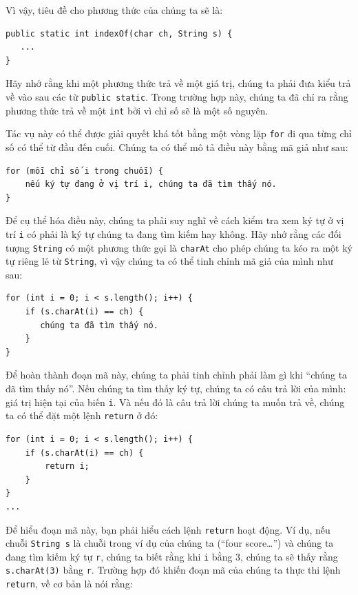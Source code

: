 Vì vậy, tiêu đề cho phương thức của chúng ta sẽ là:

\begin{verbatim}
public static int indexOf(char ch, String s) {
   ...
}
\end{verbatim}

Hãy nhớ rằng khi một phương thức trả về một giá trị, chúng ta phải đưa
kiểu trả về vào sau các từ \texttt{public\ static}. Trong trường hợp
này, chúng ta đã chỉ ra rằng phương thức trả về một \texttt{int} bởi vì
chỉ số sẽ là một số nguyên.

Tác vụ này có thể được giải quyết khá tốt bằng một vòng lặp \texttt{for}
đi qua từng chỉ số có thể từ đầu đến cuối. Chúng ta có thể mô tả điều
này bằng mã giả như sau:

\begin{verbatim}
for (mỗi chỉ số i trong chuỗi) {
    nếu ký tự đang ở vị trí i, chúng ta đã tìm thấy nó.
}
\end{verbatim}

Để cụ thể hóa điều này, chúng ta phải suy nghĩ về cách kiểm tra xem ký
tự ở vị trí \texttt{i} có phải là ký tự chúng ta đang tìm kiếm hay
không. Hãy nhớ rằng các đối tượng \texttt{String} có một phương thức gọi
là \texttt{charAt} cho phép chúng ta kéo ra một ký tự riêng lẻ từ
\texttt{String}, vì vậy chúng ta có thể tinh chỉnh mã giả của mình như
sau:

\begin{verbatim}
for (int i = 0; i < s.length(); i++) {
    if (s.charAt(i) == ch) {
       chúng ta đã tìm thấy nó.
    }
}
\end{verbatim}

Để hoàn thành đoạn mã này, chúng ta phải tinh chỉnh phải làm gì khi
``chúng ta đã tìm thấy nó''. Nếu chúng ta tìm thấy ký tự, chúng ta có
câu trả lời của mình: giá trị hiện tại của biến \texttt{i}. Và nếu đó là
câu trả lời chúng ta muốn trả về, chúng ta có thể đặt một lệnh
\texttt{return} ở đó:

\begin{verbatim}
for (int i = 0; i < s.length(); i++) {
    if (s.charAt(i) == ch) {
        return i;
    }
}
...
\end{verbatim}

Để hiểu đoạn mã này, bạn phải hiểu cách lệnh \texttt{return} hoạt động.
Ví dụ, nếu chuỗi \texttt{String\ s} là chuỗi trong ví dụ của chúng ta
(``four score\ldots{}'') và chúng ta đang tìm kiếm ký tự
\texttt{\textquotesingle{}r\textquotesingle{}}, chúng ta biết rằng khi
\texttt{i} bằng 3, chúng ta sẽ thấy rằng \texttt{s.charAt(3)} bằng
\texttt{\textquotesingle{}r\textquotesingle{}}. Trường hợp đó khiến đoạn
mã của chúng ta thực thi lệnh \texttt{return}, về cơ bản là nói rằng:

